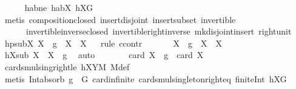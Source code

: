 \begin{isabellebody}
\ \ \ \ \isamarkupfalse%
\ habne\ habX\ hXG\ \isamarkupfalse%
\ {\isacharparenleft}{\kern0pt}metis\ composition{\isacharunderscore}{\kern0pt}closed\ insert{\isacharunderscore}{\kern0pt}disjoint{\isacharparenleft}{\kern0pt}{}{\isacharparenright}{\kern0pt}\ insert{\isacharunderscore}{\kern0pt}subset\ invertible\ \isanewline
\ \ \ \ \ \ invertible{\isacharunderscore}{\kern0pt}inverse{\isacharunderscore}{\kern0pt}closed\ invertible{\isacharunderscore}{\kern0pt}right{\isacharunderscore}{\kern0pt}inverse{}\ mk{\isacharunderscore}{\kern0pt}disjoint{\isacharunderscore}{\kern0pt}insert\ right{\isacharunderscore}{\kern0pt}unit{\isacharparenright}{\kern0pt}\isanewline
\ \ \isamarkupfalse%
\ hpsubX{\isacharcolon}{\kern0pt}\ {\isachardoublequoteopen}{\isacharparenleft}{\kern0pt}X\ {\isasymcdots}\ {\isacharbraceleft}{\kern0pt}g{\isacharbraceright}{\kern0pt}{\isacharparenright}{\kern0pt}\ {\isasyminter}\ X\ {\isasymsubset}\ X{\isachardoublequoteclose}\isanewline
\ \ \isamarkupfalse%
{\isacharparenleft}{\kern0pt}rule\ ccontr{\isacharparenright}{\kern0pt}\isanewline
\ \ \ \ \isamarkupfalse%
\ {\isachardoublequoteopen}{\isasymnot}\ {\isacharparenleft}{\kern0pt}X\ {\isasymcdots}\ {\isacharbraceleft}{\kern0pt}g{\isacharbraceright}{\kern0pt}{\isacharparenright}{\kern0pt}\ {\isasyminter}\ X\ {\isasymsubset}\ X{\isachardoublequoteclose}\isanewline
\ \ \ \ \isamarkupfalse%
\ \isamarkupfalse%
\ hXsub{\isacharcolon}{\kern0pt}\ {\isachardoublequoteopen}X\ {\isasymsubseteq}\ X\ {\isasymcdots}\ {\isacharbraceleft}{\kern0pt}g{\isacharbraceright}{\kern0pt}{\isachardoublequoteclose}\ \isamarkupfalse%
\ auto\isanewline
\ \ \ \ \isamarkupfalse%
\ \isamarkupfalse%
\ {\isachardoublequoteopen}card\ X\ {\isasymcdots}\ {\isacharbraceleft}{\kern0pt}g{\isacharbraceright}{\kern0pt}\ {\isacharequal}{\kern0pt}\ card\ X{\isachardoublequoteclose}\ \isamarkupfalse%
\ card{\isacharunderscore}{\kern0pt}smul{\isacharunderscore}{\kern0pt}sing{\isacharunderscore}{\kern0pt}right{\isacharunderscore}{\kern0pt}le\ hXYM\ M{\isacharunderscore}{\kern0pt}def\isanewline
\ \ \ \ \ \ \isamarkupfalse%
\ {\isacharparenleft}{\kern0pt}metis\ Int{\isacharunderscore}{\kern0pt}absorb{}\ {\isacartoucheopen}g\ {\isasymin}\ G{\isacartoucheclose}\ card{\isachardot}{\kern0pt}infinite\ card{\isacharunderscore}{\kern0pt}smul{\isacharunderscore}{\kern0pt}singleton{\isacharunderscore}{\kern0pt}right{\isacharunderscore}{\kern0pt}eq\ finite{\isacharunderscore}{\kern0pt}Int\ hXG{\isacharparenright}{\kern0pt}\isanewline

\end{isabellebody}
